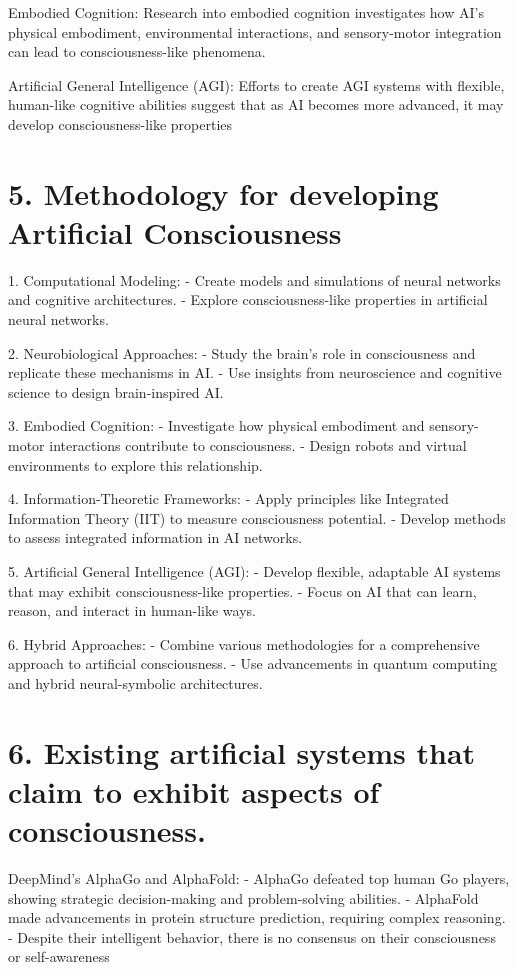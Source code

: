 \documentclass{article}
\begin{document}
Embodied Cognition:
Research into embodied cognition investigates how AI's physical embodiment, environmental interactions, and sensory-motor integration can lead to consciousness-like phenomena.

Artificial General Intelligence (AGI):
Efforts to create AGI systems with flexible, human-like cognitive abilities suggest that as AI becomes more advanced, it may develop consciousness-like properties


\section*{5. Methodology for developing Artificial Consciousness}

1. Computational Modeling:
   - Create models and simulations of neural networks and cognitive architectures.
   - Explore consciousness-like properties in artificial neural networks.

2. Neurobiological Approaches:
   - Study the brain's role in consciousness and replicate these mechanisms in AI.
   - Use insights from neuroscience and cognitive science to design brain-inspired AI.

3. Embodied Cognition:
   - Investigate how physical embodiment and sensory-motor interactions contribute to consciousness.
   - Design robots and virtual environments to explore this relationship.

4. Information-Theoretic Frameworks:
   - Apply principles like Integrated Information Theory (IIT) to measure consciousness potential.
   - Develop methods to assess integrated information in AI networks.

5. Artificial General Intelligence (AGI):
   - Develop flexible, adaptable AI systems that may exhibit consciousness-like properties.
   - Focus on AI that can learn, reason, and interact in human-like ways.

6. Hybrid Approaches:
   - Combine various methodologies for a comprehensive approach to artificial consciousness.
   - Use advancements in quantum computing and hybrid neural-symbolic architectures.


\section*{6. Existing artificial systems that claim to exhibit aspects of consciousness.}
DeepMind's AlphaGo and AlphaFold:
   - AlphaGo defeated top human Go players, showing strategic decision-making and problem-solving abilities.
   - AlphaFold made advancements in protein structure prediction, requiring complex reasoning.
   - Despite their intelligent behavior, there is no consensus on their consciousness or self-awareness
\end{document}

